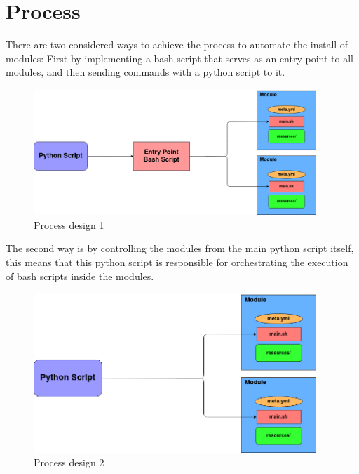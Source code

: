 \section{Process}
There are two considered ways to achieve the process to automate the install of modules:
First by implementing a bash script that serves as an entry point to all modules, and then sending commands with a python script to it.\\

\begin{figure}[!ht]
\centering
\includegraphics[width=0.95\textwidth]{resources/figures/process1.png}
\caption{Process design 1}
\label{fig:process1}
\end{figure}

\clearpage

The second way is by controlling the modules from the main python script itself, this means that this python script is responsible for orchestrating the execution of bash scripts inside the modules.\\

\begin{figure}[!ht]
\centering
\includegraphics[width=0.95\textwidth]{resources/figures/process2.png}
\caption{Process design 2}
\label{fig:process2}
\end{figure}

